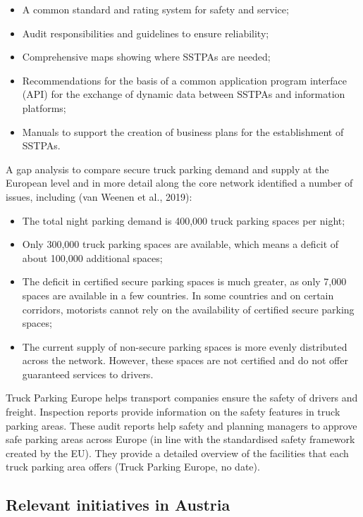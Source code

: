 \documentclass[
]{book}
\providecommand{\tightlist}{%
  \setlength{\itemsep}{0pt}\setlength{\parskip}{0pt}}
\begin{document}
\begin{itemize}
\tightlist
\item
  A common standard and rating system for safety and service;
\item
  Audit responsibilities and guidelines to ensure reliability;
\item
  Comprehensive maps showing where SSTPAs are needed;
\item
  Recommendations for the basis of a common application program interface (API) for the exchange of dynamic data between SSTPAs and information platforms;
\item
  Manuals to support the creation of business plans for the establishment of SSTPAs.
\end{itemize}

A gap analysis to compare secure truck parking demand and supply at the European level and in more detail along the core network identified a number of issues, including (van Weenen et al., 2019):

\begin{itemize}
\tightlist
\item
  The total night parking demand is 400,000 truck parking spaces per night;
\item
  Only 300,000 truck parking spaces are available, which means a deficit of about 100,000 additional spaces;
\item
  The deficit in certified secure parking spaces is much greater, as only 7,000 spaces are available in a few countries. In some countries and on certain corridors, motorists cannot rely on the availability of certified secure parking spaces;
\item
  The current supply of non-secure parking spaces is more evenly distributed across the network. However, these spaces are not certified and do not offer guaranteed services to drivers.
\end{itemize}

Truck Parking Europe helps transport companies ensure the safety of drivers and freight. Inspection reports provide information on the safety features in truck parking areas. These audit reports help safety and planning managers to approve safe parking areas across Europe (in line with the standardised safety framework created by the EU). They provide a detailed overview of the facilities that each truck parking area offers (Truck Parking Europe, no date).

\hypertarget{relevant-initiatives-in-austria-31}{%
\subsection*{Relevant initiatives in Austria}\label{relevant-initiatives-in-austria-31}}
\end{document}
